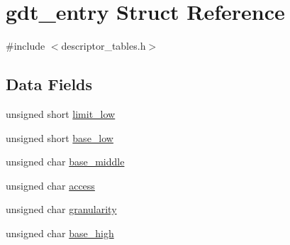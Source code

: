 \hypertarget{structgdt__entry}{
\section{gdt\_\-entry Struct Reference}
\label{structgdt__entry}
}


{\ttfamily \#include $<$descriptor\_\-tables.h$>$}

\subsection*{Data Fields}
\begin{DoxyCompactItemize}
\item 
unsigned short \hyperlink{structgdt__entry_aacba9616b9bdd5895e8dcf5567e4170c}{limit\_\-low}
\item 
unsigned short \hyperlink{structgdt__entry_ae4b82d5bd06e0cad3df76bcabedfe194}{base\_\-low}
\item 
unsigned char \hyperlink{structgdt__entry_a11134ae8e899bd8f22b3d59dd5b86fae}{base\_\-middle}
\item 
unsigned char \hyperlink{structgdt__entry_a1466f288c685860255d8e68192262c44}{access}
\item 
unsigned char \hyperlink{structgdt__entry_a97775c42d71e8858948fa91b472876fb}{granularity}
\item 
unsigned char \hyperlink{structgdt__entry_a2ece4ce625dcee29c9a9e6952055ddd5}{base\_\-high}
\end{DoxyCompactItemize}



